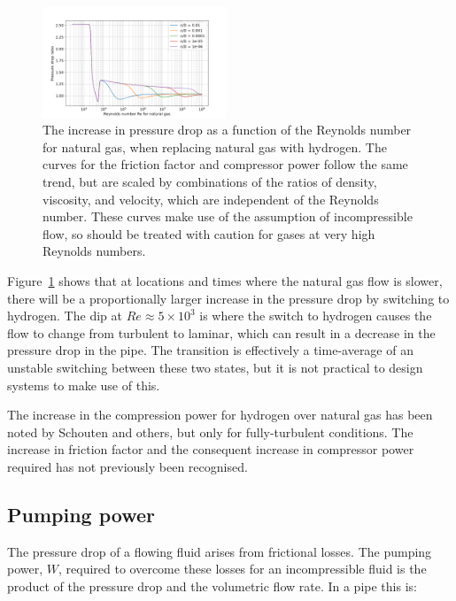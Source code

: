 \documentclass[5p]{elsarticle} %
\begin{document}
\begin{figure}[htb]
\centering
\includegraphics[width=0.49\textwidth]{p2_h2_ratio.png}
\caption{The increase in pressure drop as a function of the Reynolds number for natural gas, when replacing natural gas with hydrogen. The curves for the friction factor and compressor power follow the same trend, but are scaled by combinations of the ratios of density, viscosity, and velocity, which are independent of the Reynolds number. These curves make use of the assumption of incompressible flow, so should be treated with caution for gases at very high Reynolds numbers.}
\label{fig:pressuredrop}
\end{figure}

Figure~\ref{fig:pressuredrop} shows that at locations and times where the natural gas flow is slower, there will be a proportionally larger increase in the pressure drop by switching to hydrogen.
The dip at $Re\approx5\times10^3$ is where the switch to hydrogen causes the flow to change from turbulent to laminar, which can result in a decrease in the pressure drop in the pipe.
The transition is effectively a time-average of an unstable switching between these two states, but it is not practical to design systems to make use of this.

The increase in the compression power for hydrogen over natural gas has been noted by Schouten\citep{Schouten2004} and others, but only for fully-turbulent conditions. 
The increase in friction factor and the consequent increase in compressor power required has not previously been recognised.

\subsection{Pumping power}
\label{sec:comppower}

The pressure drop of a flowing fluid arises from frictional losses. 
The pumping power, $W$, required to overcome these losses for an incompressible fluid is the product of the pressure drop and the volumetric flow rate. 
In a pipe\citep{Bennet2017} this is:
\end{document}
